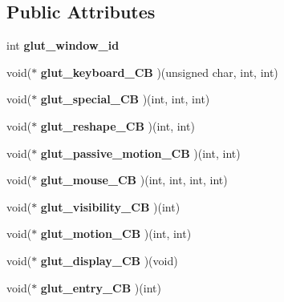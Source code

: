 \subsection*{Public Attributes}
\begin{DoxyCompactItemize}
\item 
\hypertarget{classGLUI__Glut__Window_a1eeae65875356396ec81ffd63d0b096a}{int {\bfseries glut\-\_\-window\-\_\-id}}\label{classGLUI__Glut__Window_a1eeae65875356396ec81ffd63d0b096a}

\item 
\hypertarget{classGLUI__Glut__Window_a299ae81dcf534d460bac55a897cf540b}{void($\ast$ {\bfseries glut\-\_\-keyboard\-\_\-\-C\-B} )(unsigned char, int, int)}\label{classGLUI__Glut__Window_a299ae81dcf534d460bac55a897cf540b}

\item 
\hypertarget{classGLUI__Glut__Window_a6195cf472a03676f14c86e29a4d2ad5b}{void($\ast$ {\bfseries glut\-\_\-special\-\_\-\-C\-B} )(int, int, int)}\label{classGLUI__Glut__Window_a6195cf472a03676f14c86e29a4d2ad5b}

\item 
\hypertarget{classGLUI__Glut__Window_ab80f91ef7790e98a3fb96f5d2fc3bcad}{void($\ast$ {\bfseries glut\-\_\-reshape\-\_\-\-C\-B} )(int, int)}\label{classGLUI__Glut__Window_ab80f91ef7790e98a3fb96f5d2fc3bcad}

\item 
\hypertarget{classGLUI__Glut__Window_afc4066e60731680d782efaed8a7bc3b1}{void($\ast$ {\bfseries glut\-\_\-passive\-\_\-motion\-\_\-\-C\-B} )(int, int)}\label{classGLUI__Glut__Window_afc4066e60731680d782efaed8a7bc3b1}

\item 
\hypertarget{classGLUI__Glut__Window_a126b91fbf4e55fd2a099bb43c5949654}{void($\ast$ {\bfseries glut\-\_\-mouse\-\_\-\-C\-B} )(int, int, int, int)}\label{classGLUI__Glut__Window_a126b91fbf4e55fd2a099bb43c5949654}

\item 
\hypertarget{classGLUI__Glut__Window_aaf80a162394308539654d8451d25d49b}{void($\ast$ {\bfseries glut\-\_\-visibility\-\_\-\-C\-B} )(int)}\label{classGLUI__Glut__Window_aaf80a162394308539654d8451d25d49b}

\item 
\hypertarget{classGLUI__Glut__Window_ae5f6057d61f1808b2b0ab39b89a7113e}{void($\ast$ {\bfseries glut\-\_\-motion\-\_\-\-C\-B} )(int, int)}\label{classGLUI__Glut__Window_ae5f6057d61f1808b2b0ab39b89a7113e}

\item 
\hypertarget{classGLUI__Glut__Window_a08233e5acd66dc19bf453e423b0cd6c9}{void($\ast$ {\bfseries glut\-\_\-display\-\_\-\-C\-B} )(void)}\label{classGLUI__Glut__Window_a08233e5acd66dc19bf453e423b0cd6c9}

\item 
\hypertarget{classGLUI__Glut__Window_a0f17b9ee70f25c694dfb546b0d2ae6a8}{void($\ast$ {\bfseries glut\-\_\-entry\-\_\-\-C\-B} )(int)}\label{classGLUI__Glut__Window_a0f17b9ee70f25c694dfb546b0d2ae6a8}

\end{DoxyCompactItemize}
